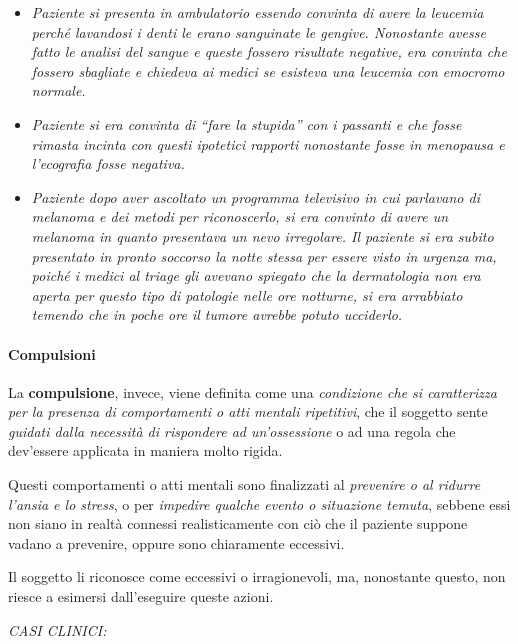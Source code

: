 \begin{itemize}
{  è davvero venuto il dubbio di esserlo.}
\item
  \emph{Paziente si presenta in ambulatorio essendo convinta di avere la
  leucemia perché lavandosi i denti le erano sanguinate le gengive.
  Nonostante avesse fatto le analisi del sangue e queste fossero
  risultate negative, era convinta che fossero sbagliate e chiedeva ai
  medici se esisteva una leucemia con emocromo normale.}
\item
  \emph{Paziente si era convinta di ``fare la stupida'' con i passanti e
  che fosse rimasta incinta con questi ipotetici rapporti nonostante
  fosse in menopausa e l'ecografia fosse negativa.}
\item
  \emph{Paziente dopo aver ascoltato un programma televisivo in cui
  parlavano di melanoma e dei metodi per riconoscerlo, si era convinto
  di avere un melanoma in quanto presentava un nevo irregolare. Il
  paziente si era subito presentato in pronto soccorso la notte stessa
  per essere visto in urgenza ma, poiché i medici al triage gli avevano
  spiegato che la dermatologia non era aperta per questo tipo di
  patologie nelle ore notturne, si era arrabbiato temendo che in poche
  ore il tumore avrebbe potuto ucciderlo. }
\end{itemize}

\paragraph{Compulsioni}

La \textbf{compulsione}, invece, viene definita come una
\emph{condizione che si caratterizza per la presenza di comportamenti o
atti mentali ripetitivi}, che il soggetto sente \emph{guidati dalla
necessità di rispondere ad un'ossessione} o ad una regola che dev'essere
applicata in maniera molto rigida.

Questi comportamenti o atti mentali sono finalizzati al \emph{prevenire
o al ridurre l'ansia e lo stress}, o per \emph{impedire qualche evento o
situazione temuta}, sebbene essi non siano in realtà connessi
realisticamente con ciò che il paziente suppone vadano a prevenire,
oppure sono chiaramente eccessivi.

Il soggetto li riconosce come eccessivi o irragionevoli, ma, nonostante
questo, non riesce a esimersi dall'eseguire queste azioni.

\emph{\emph{CASI CLINICI:}}

